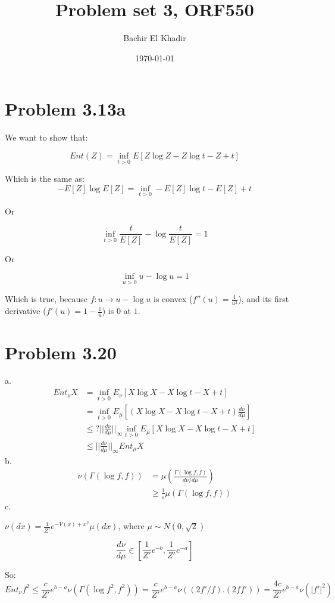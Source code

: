 \documentclass[11pt]{article}
\author{Bachir El Khadir}
\date{\today}
\title{Problem set 3, ORF550}
\begin{document}
\maketitle

\section{Problem 3.13a}
\label{sec:orgheadline1}
We want to show that:

$$Ent(Z) = \inf_{t > 0} E[Z\log Z - Z\log t - Z + t]$$

Which is the same as:
$$- E[Z]\log E[Z] = \inf_{t > 0}  - E[Z]\log t  -E[Z] + t$$

Or

$$ \inf_{t > 0}   \frac{t}{E[Z]} - \log \frac{t}{E[Z]}   = 1$$

Or

$$\inf_{u > 0} u - \log u = 1$$

Which is true, because \(f: u \rightarrow u - \log u\) is convex (\(f''(u) = \frac1{u^2}\)), and its first derivative (\(f'(u) = 1-\frac1u\)) is \(0\) at \(1\).

\section{Problem 3.20}
\label{sec:orgheadline2}
a.
\begin{align*}
Ent_{\nu} X &= \inf_{t > 0} E_{\nu}[X\log X - X \log t - X + t]
\\&= \inf_{t > 0} E_{\mu}[(X\log X - X \log t - X + t) \frac{d\nu}{d\mu}]
\\&\le ? ||\frac{d\nu}{d\mu}||_{\infty} \inf_{t > 0} E_{\mu}[ X\log X - X \log t - X + t ] 
\\&\le ||\frac{d\nu}{d\mu}||_{\infty} Ent_{\mu} X
\end{align*}
b.
\begin{align*}
\nu(\Gamma(\log f, f))
&= \mu(\frac{\Gamma(\log f, f)}{d\nu/d\mu} )
\\&\ge \frac1{\varepsilon}\mu(\Gamma(\log f, f) )
\end{align*}
c.

\(\nu(dx) = \frac1{Z'} e^{-V(x)+x^2} \mu(dx)\), where \(\mu \sim N(0, \sqrt 2)\)

$$\frac{d\nu}{d\mu} \in  [\frac1{Z'}e^{-b}, \frac1{Z'}e^{-a}]$$

So:
$$Ent_{\nu} f^2 \le \frac{c}{Z'}e^{b-a} \nu(\Gamma(\log f^2, f^2)) = \frac{c}{Z'}e^{b-a} \nu( (2f'/f). (2f f')) = \frac{4c}{Z'}e^{b-a} \nu( |f'|^2)$$
\end{document}
